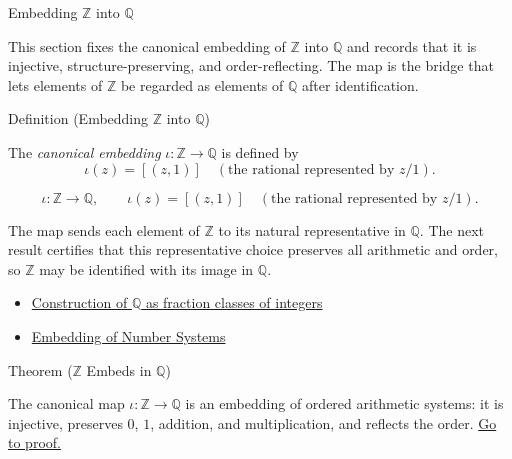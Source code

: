 \label{sec:embedding-z-into-q}

\begin{topicbox}{Embedding $\mathbb{Z}$ into $\mathbb{Q}$}
\begin{exposition}
This section fixes the canonical embedding of $\mathbb{Z}$ into $\mathbb{Q}$ and records that it is injective, structure-preserving, and order-reflecting. The map is the bridge that lets elements of $\mathbb{Z}$ be regarded as elements of $\mathbb{Q}$ after identification.
\end{exposition}
\end{topicbox}
\begin{definitionbox}{Definition (Embedding $\mathbb{Z}$ into $\mathbb{Q}$)}
\begin{definition}
\label{def:embedding-z-into-q}
The \emph{canonical embedding} $\iota:\mathbb{Z}\to \mathbb{Q}$ is defined by
\[
\iota(z)=\left[(z,1)\right] \quad(\text{the rational represented by } z/1).
\]
\end{definition}
\end{definitionbox}
\begin{remark*}
\[
\iota:\mathbb{Z}\to \mathbb{Q},\qquad \iota(z)=\left[(z,1)\right] \quad(\text{the rational represented by } z/1).
\]
\end{remark*}
\begin{remark*}[Interpretation]
The map sends each element of $\mathbb{Z}$ to its natural representative in $\mathbb{Q}$. The next result certifies that this representative choice preserves all arithmetic and order, so $\mathbb{Z}$ may be identified with its image in $\mathbb{Q}$.
\end{remark*}
\begin{dependencies}
\begin{itemize}
  \item \hyperref[def:rationals]{Construction of $\mathbb{Q}$ as fraction classes of integers}
  \item \hyperref[def:number-system-embedding]{Embedding of Number Systems}
\end{itemize}
\end{dependencies}
\begin{theorembox}{Theorem ($\mathbb{Z}$ Embeds in $\mathbb{Q}$)}
\begin{theorem}
\label{thm:z-embeds-in-q}
The canonical map $\iota:\mathbb{Z}\to \mathbb{Q}$ is an embedding of ordered arithmetic systems: it is injective, preserves $0$, $1$, addition, and multiplication, and reflects the order.
\hyperref[prf:z-embeds-in-q]{Go to proof.}
\end{theorem}
\end{theorembox}
